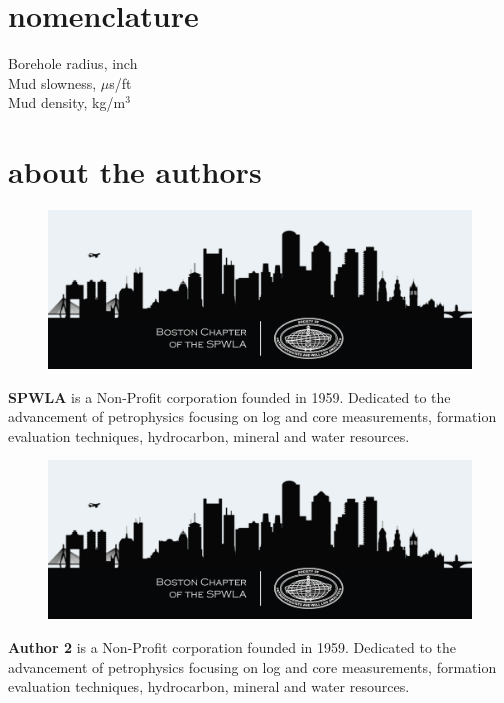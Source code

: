 \documentclass[10pt,twocolumn,twoside]{article}
\begin{document}
\section{nomenclature}
  Borehole radius, inch\\
  Mud slowness, $\mu$s/ft\\
  Mud density, kg/m$^3$




\section{about the authors}
\setlength\intextsep{0pt}
\begin{figure}
	\includegraphics[width=1.0\linewidth]{boston_chapter_logo.png}
	\vspace{0.03in}
\end{figure}
\textbf{SPWLA} is a Non-Profit corporation founded in 1959. Dedicated to the advancement of petrophysics focusing on log and core measurements, formation evaluation techniques, hydrocarbon, mineral and water resources.

\begin{figure}
	\includegraphics[width=1.0\linewidth]{boston_chapter_logo.png}
	\vspace{0.03in}
\end{figure}
\textbf{Author 2} is a Non-Profit corporation founded in 1959. Dedicated to the advancement of petrophysics focusing on log and core measurements, formation evaluation techniques, hydrocarbon, mineral and water resources.
\end{document}
